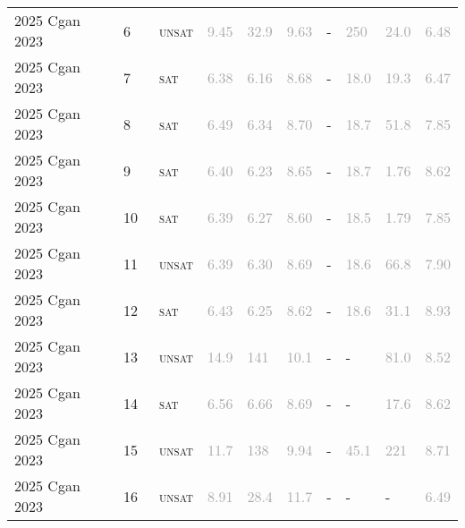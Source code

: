 \begin{center}
{\begin{longtable}{@{}llllllllll@{}}
2025 Cgan 2023 & 6 & ~\textsc{unsat} & \textcolor{darkgray}{9.45} & \textcolor{darkgray}{32.9} & \textcolor{darkgray}{9.63} & - & \textcolor{darkgray}{250} & \textcolor{darkgray}{24.0} & \textcolor{darkgray}{6.48} \\
2025 Cgan 2023 & 7 & ~\textsc{sat} & \textcolor{darkgray}{6.38} & \textcolor{darkgray}{6.16} & \textcolor{darkgray}{8.68} & - & \textcolor{darkgray}{18.0} & \textcolor{darkgray}{19.3} & \textcolor{darkgray}{6.47} \\
2025 Cgan 2023 & 8 & ~\textsc{sat} & \textcolor{darkgray}{6.49} & \textcolor{darkgray}{6.34} & \textcolor{darkgray}{8.70} & - & \textcolor{darkgray}{18.7} & \textcolor{darkgray}{51.8} & \textcolor{darkgray}{7.85} \\
2025 Cgan 2023 & 9 & ~\textsc{sat} & \textcolor{darkgray}{6.40} & \textcolor{darkgray}{6.23} & \textcolor{darkgray}{8.65} & - & \textcolor{darkgray}{18.7} & \textcolor{darkgray}{1.76} & \textcolor{darkgray}{8.62} \\
2025 Cgan 2023 & 10 & ~\textsc{sat} & \textcolor{darkgray}{6.39} & \textcolor{darkgray}{6.27} & \textcolor{darkgray}{8.60} & - & \textcolor{darkgray}{18.5} & \textcolor{darkgray}{1.79} & \textcolor{darkgray}{7.85} \\
2025 Cgan 2023 & 11 & ~\textsc{unsat} & \textcolor{darkgray}{6.39} & \textcolor{darkgray}{6.30} & \textcolor{darkgray}{8.69} & - & \textcolor{darkgray}{18.6} & \textcolor{darkgray}{66.8} & \textcolor{darkgray}{7.90} \\
2025 Cgan 2023 & 12 & ~\textsc{sat} & \textcolor{darkgray}{6.43} & \textcolor{darkgray}{6.25} & \textcolor{darkgray}{8.62} & - & \textcolor{darkgray}{18.6} & \textcolor{darkgray}{31.1} & \textcolor{darkgray}{8.93} \\
2025 Cgan 2023 & 13 & ~\textsc{unsat} & \textcolor{darkgray}{14.9} & \textcolor{darkgray}{141} & \textcolor{darkgray}{10.1} & - & - & \textcolor{darkgray}{81.0} & \textcolor{darkgray}{8.52} \\
2025 Cgan 2023 & 14 & ~\textsc{sat} & \textcolor{darkgray}{6.56} & \textcolor{darkgray}{6.66} & \textcolor{darkgray}{8.69} & - & - & \textcolor{darkgray}{17.6} & \textcolor{darkgray}{8.62} \\
2025 Cgan 2023 & 15 & ~\textsc{unsat} & \textcolor{darkgray}{11.7} & \textcolor{darkgray}{138} & \textcolor{darkgray}{9.94} & - & \textcolor{darkgray}{45.1} & \textcolor{darkgray}{221} & \textcolor{darkgray}{8.71} \\
2025 Cgan 2023 & 16 & ~\textsc{unsat} & \textcolor{darkgray}{8.91} & \textcolor{darkgray}{28.4} & \textcolor{darkgray}{11.7} & - & - & - & \textcolor{darkgray}{6.49} \\

\end{longtable}}
\end{center}
